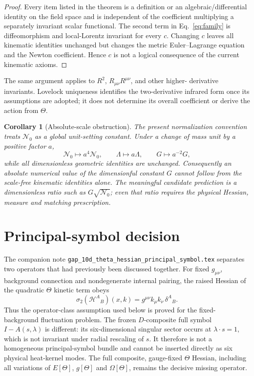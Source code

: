 \documentclass[11pt,a4paper]{article}
\newtheorem{corollary}[theorem]{Corollary}
\begin{document}
\begin{proof}
Every item listed in the theorem is a definition or an algebraic/differential
identity on the field space and is independent of the coefficient multiplying
a separately invariant scalar functional.  The second term in
Eq.~\eqref{eq:family} is diffeomorphism and local-Lorentz invariant for every
$c$.  Changing $c$ leaves all kinematic identities unchanged but changes the
metric Euler--Lagrange equation and the Newton coefficient.  Hence $c$ is not a
logical consequence of the current kinematic axioms.
\end{proof}

The same argument applies to $R^2$, $R_{\mu\nu}R^{\mu\nu}$, and other higher-
derivative invariants.  Lovelock uniqueness identifies the two-derivative
infrared form once its assumptions are adopted; it does not determine its
overall coefficient or derive the action from $\Theta$.

\begin{corollary}[Absolute-scale obstruction]\label{cor:scale}
The present normalization convention treats $\mathcal N_0$ as a global
unit-setting constant.  Under a change of mass unit by a positive factor $a$,
\begin{equation}
 \mathcal N_0\mapsto a^4\mathcal N_0,\qquad
 \Lambda\mapsto a\Lambda,\qquad
 G\mapsto a^{-2}G,
\end{equation}
while all dimensionless geometric identities are unchanged.  Consequently an
absolute numerical value of the dimensionful constant $G$ cannot follow from
the scale-free kinematic identities alone.  The meaningful candidate
prediction is a dimensionless ratio such as $G\sqrt{\mathcal N_0}$; even that
ratio requires the physical Hessian, measure and matching prescription.
\end{corollary}

\section{Principal-symbol decision}
The companion note
\texttt{gap\_10d\_theta\_hessian\_principal\_symbol.tex} separates two
operators that had previously been discussed together.  For fixed
$g_{\mu\nu}$, background connection and nondegenerate internal pairing, the
raised Hessian of the quadratic $\Theta$ kinetic term obeys
\[
 \sigma_2(\mathcal H^A{}_B)(x,k)
 =g^{\mu\nu}k_\mu k_\nu\,\delta^A{}_B.
\]
Thus the operator-class assumption used below is proved for the
fixed-background fluctuation problem.  The frozen $D$-composite full symbol
$ I-A(s,\lambda)$ is different: its six-dimensional singular sector occurs at
$\lambda\cdot s=1$, which is not invariant under radial rescaling of $s$.
It therefore is not a homogeneous principal-symbol bundle and cannot be
inserted directly as six physical heat-kernel modes.  The full composite,
gauge-fixed $\Theta$ Hessian, including all variations of
$E[\Theta]$, $g[\Theta]$ and $\Omega[\Theta]$, remains the decisive missing
operator.
\end{document}
